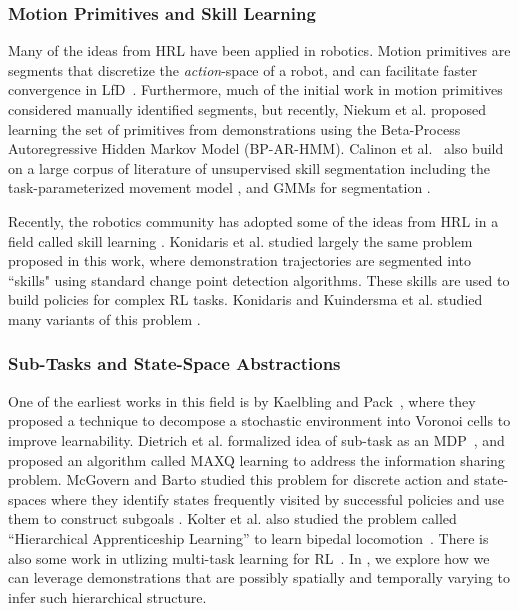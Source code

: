 \subsubsection{Motion Primitives and Skill Learning}
Many of the ideas from HRL have been applied in robotics.
Motion primitives are segments that discretize the \emph{action}-space of a robot, and can facilitate faster convergence in LfD~\cite{ijspreet2002learning,pastor2009learning,manschitz2015learning}.
Furthermore, much of the initial work in motion primitives considered manually identified segments, but recently, Niekum et al. \cite{niekum2012learning} proposed learning the set of primitives from demonstrations using the Beta-Process Autoregressive Hidden Markov Model (BP-AR-HMM).
Calinon et al.~\cite{calinon2014skills} also build on a large corpus of literature of unsupervised skill segmentation including the task-parameterized movement model \cite{calinon2014task}, and GMMs for segmentation \cite{calinon2010learning}.

Recently, the robotics community has adopted some of the ideas from HRL in a field called skill learning \cite{konidaris2011robot}. Konidaris et al. studied largely the same problem proposed in this work, where demonstration trajectories are segmented into ``skills" using standard change point detection algorithms. These skills are used to build policies for complex RL tasks. Konidaris and Kuindersma et al.  studied many variants of this problem \cite{konidaris2009efficient}. 

\subsubsection{Sub-Tasks and State-Space Abstractions}
One of the earliest works in this field is by Kaelbling and Pack~\cite{kaelbling1993hierarchical}, where they proposed a technique to decompose a stochastic environment into Voronoi cells to improve learnability.
Dietrich et al. formalized idea of sub-task as an MDP~\cite{dietterich2000hierarchical}, and proposed an algorithm called MAXQ learning to address the information sharing problem.
McGovern and Barto studied this problem for discrete action and state-spaces where they identify states frequently visited by successful policies and use them to construct subgoals \cite{mcgovern2001automatic}. 
Kolter et al. also studied the problem called ``Hierarchical Apprenticeship Learning'' to learn bipedal locomotion~\cite{DBLP:conf/nips/KolterAN07}.
There is also some work in utlizing multi-task learning for RL~\cite{calandriello2014sparse}.
In \hirl, we explore how we can leverage demonstrations that are possibly spatially and temporally varying to infer such hierarchical structure.

